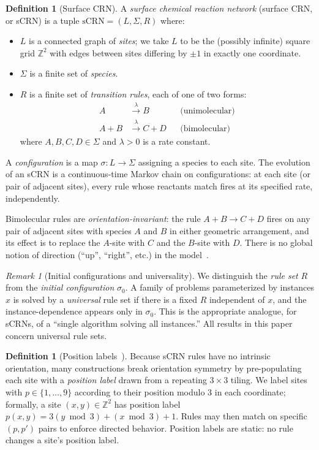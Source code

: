 \documentclass[11pt]{article}
\theoremstyle{plain}
\theoremstyle{definition}
\newtheorem{definition}[theorem]{Definition}
\theoremstyle{remark}
\newtheorem{remark}[theorem]{Remark}
\newcommand{\Z}{\mathbb{Z}}
\newcommand{\sCRN}{\text{sCRN}}
\begin{document}
\begin{definition}[Surface CRN]
\label{def:scrn}
A \emph{surface chemical reaction network} (surface CRN, or sCRN) is a tuple $\sCRN = (L, \Sigma, R)$ where:
\begin{itemize}
    \item $L$ is a connected graph of \emph{sites}; we take $L$ to be the (possibly infinite) square grid $\Z^2$ with edges between sites differing by $\pm 1$ in exactly one coordinate.
    \item $\Sigma$ is a finite set of \emph{species}.
    \item $R$ is a finite set of \emph{transition rules}, each of one of two forms:
    \begin{align*}
        A &\xrightarrow{\lambda} B && \text{(unimolecular)} \\
        A + B &\xrightarrow{\lambda} C + D && \text{(bimolecular)}
    \end{align*}
    where $A, B, C, D \in \Sigma$ and $\lambda > 0$ is a rate constant.
\end{itemize}
A \emph{configuration} is a map $\sigma: L \to \Sigma$ assigning a species to each site. The evolution of an sCRN is a continuous-time Markov chain on configurations: at each site (or pair of adjacent sites), every rule whose reactants match fires at its specified rate, independently.
\end{definition}

Bimolecular rules are \emph{orientation-invariant}: the rule $A + B \to C + D$ fires on any pair of adjacent sites with species $A$ and $B$ in either geometric arrangement, and its effect is to replace the $A$-site with $C$ and the $B$-site with $D$. There is no global notion of direction (``up'', ``right'', etc.) in the model~\cite{clamons2020}.

\begin{remark}[Initial configurations and universality]
\label{rem:universal}
We distinguish the \emph{rule set} $R$ from the \emph{initial configuration} $\sigma_0$. A family of problems parameterized by instances $x$ is solved by a \emph{universal} rule set if there is a fixed $R$ independent of $x$, and the instance-dependence appears only in $\sigma_0$. This is the appropriate analogue, for sCRNs, of a ``single algorithm solving all instances.'' All results in this paper concern universal rule sets.
\end{remark}

\begin{definition}[Position labels~\cite{clamons2020}]
\label{def:position-labels}
Because sCRN rules have no intrinsic orientation, many constructions break orientation symmetry by pre-populating each site with a \emph{position label} drawn from a repeating $3\times 3$ tiling. We label sites with $p \in \{1, \ldots, 9\}$ according to their position modulo 3 in each coordinate; formally, a site $(x, y) \in \Z^2$ has position label $p(x,y) = 3 (y \bmod 3) + (x \bmod 3) + 1$. Rules may then match on specific $(p, p')$ pairs to enforce directed behavior. Position labels are static: no rule changes a site's position label.
\end{definition}
\end{document}
